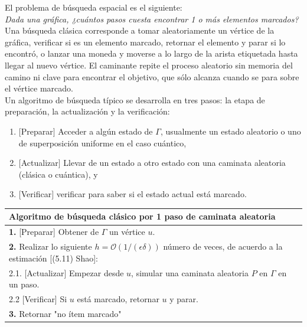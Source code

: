 El problema de búsqueda espacial es el siguiente:\\

\textit{Dada una gráfica, ¿cuántos pasos cuesta encontrar 1 o más elementos  marcados?}\\

Una búsqueda clásica corresponde a tomar aleatoriamente un vértice de la gráfica, verificar si es un elemento marcado, retornar el elemento y parar si lo encontró, o lanzar una moneda y moverse a lo largo de la arista etiquetada hasta llegar al nuevo vértice. El caminante repite el proceso aleatorio sin memoria del camino ni clave para encontrar el objetivo, que sólo alcanza cuando se para sobre el vértice marcado.\\

Un algoritmo de búsqueda típico se desarrolla en tres pasos: la etapa de preparación, la actualización y la verificación:
\begin{enumerate}
    \item $[$Preparar$]$ Acceder a algún estado de $\Gamma$, usualmente un estado aleatorio o uno de superposición uniforme en el caso cuántico,
    \item $[$Actualizar$]$ Llevar de un estado a otro estado con una caminata aleatoria (clásica o cuántica), y
    \item $[$Verificar$]$ verificar para saber si el estado actual está marcado.
\end{enumerate}

\begin{center}
    \begin{tabular}{|l|}
    \hline \textbf{Algoritmo de búsqueda clásico} por 1 paso de caminata aleatoria\\\hline 
    \textbf{1.} [Preparar] Obtener de $\Gamma$ un vértice $u$.\\
    \textbf{2.} Realizar lo siguiente $h=\mathcal{O}(1/(\epsilon \delta))$ número de veces, de acuerdo a la estimación [(5.11) Shao]:\\
    2.1. [Actualizar] Empezar desde $u$, simular una caminata aleatoria $P$ en $\Gamma$ en un paso.\\
    2.2 [Verificar] Si $u$ está marcado, retornar $u$ y  parar.\\
    \textbf{3.} Retornar "no ítem marcado"\\\hline
    \end{tabular}{}
\end{center}{}

